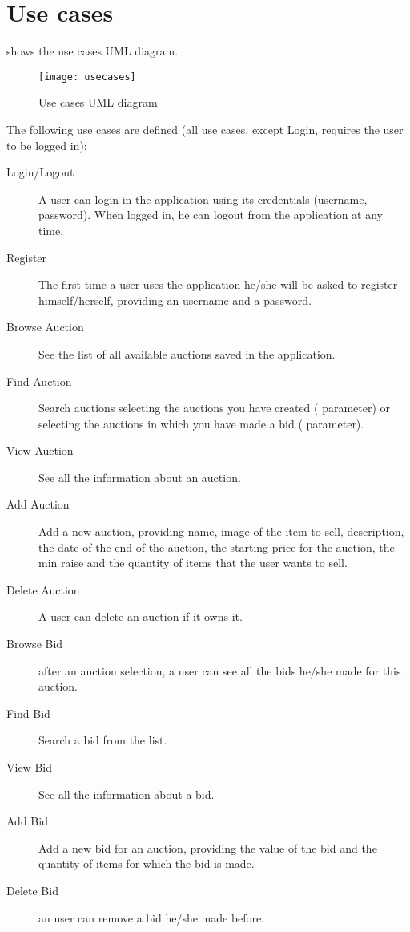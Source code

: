 \chapter{Use cases}\label{ch:usecases}

 shows the use cases UML diagram.

\begin{figure}[htb]
	\centering
	\texttt{[image: usecases]}
	\caption{Use cases UML diagram}\label{fig:usecases}
\end{figure}

The following use cases are defined (all use cases, except Login, requires the
user to be logged in):
\begin{description}
	\item[Login/Logout] A user can login in the application using its
		credentials (username, password). When logged in, he can logout
		from the application at any time.
	\item[Register] The first time a user uses the application he/she will
		be asked to register himself/herself, providing an username and
		a password.
	\item[Browse Auction] See the list of all available auctions saved in
		the application.
	\item[Find Auction] Search auctions selecting the auctions you have
		created ( parameter) or selecting the auctions
		in which you have made a bid ( parameter).
	\item[View Auction] See all the information about an auction.
	\item[Add Auction] Add a new auction, providing name, image of the item
		to sell, description, the date of the end of the auction, the
		starting price for the auction, the min raise and the quantity
		of items that the user wants to sell.
	\item[Delete Auction] A user can delete an auction if it owns it.
	\item[Browse Bid] after an auction selection, a user can see all the
		bids he/she made for this auction.
	\item[Find Bid] Search a bid from the list.
	\item[View Bid] See all the information about a bid.
	\item[Add Bid] Add a new bid for an auction, providing the value of the
		bid and the quantity of items for which the bid is made.
	\item[Delete Bid] an user can remove a bid he/she made before.
\end{description}
